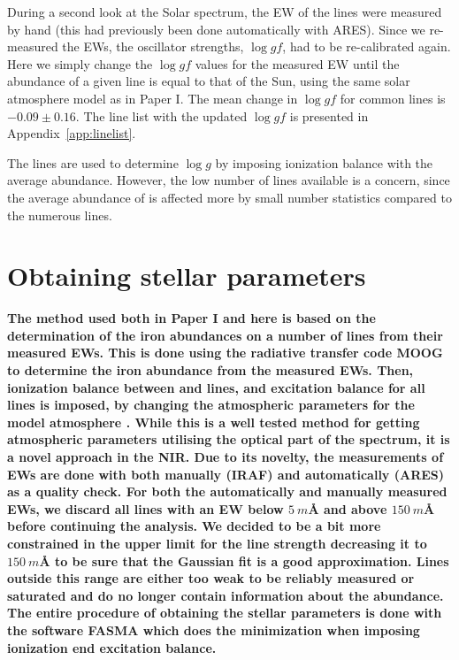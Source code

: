 \documentclass{aa}
\begin{document}
During a second look at the Solar spectrum, the EW of the lines were measured by
hand (this had previously been done automatically with ARES). Since we
re-measured the EWs, the oscillator strengths, $\log \mathit{gf}$, had to be
re-calibrated again. Here we simply change the $\log \mathit{gf}$ values for the
measured EW until the abundance of a given line is equal to that of the Sun,
using the same solar atmosphere model as in Paper I. The mean change in $\log
\mathit{gf}$ for common lines is $-0.09 \pm 0.16$. The line list with the
updated $\log \mathit{gf}$ is presented in Appendix~\ref{app:linelist}.

The  lines are used to determine $\log g$ by imposing ionization
balance with the average  abundance. However, the low number of
 lines available is a concern, since the average abundance of
 is affected more by small number statistics compared to the
numerous  lines.


\section{Obtaining stellar parameters}
\label{sec:method}

{\bf The method used both in Paper I and here is based on the determination of
the iron abundances on a number of lines from their measured EWs. This is done
using the radiative transfer code MOOG \citep{Sneden1973} to determine the iron
abundance from the measured EWs. Then, ionization balance between 
and  lines, and excitation balance for all  lines is
imposed, by changing the atmospheric parameters for the model atmosphere
\citep[][ATLAS9 is used here]{Kurucz1993}. While this is a well tested method
for getting atmospheric parameters utilising the optical part of the spectrum,
it is a novel approach in the NIR. Due to its novelty, the measurements of EWs
are done with both manually (IRAF) and automatically (ARES) as a quality check.
For both the automatically and manually measured EWs, we discard all lines with
an EW below $\SI{5}{m}$\AA{} and above $\SI{150}{m}$\AA{} before continuing the
analysis. We decided to be a bit more constrained in the upper limit for the
line strength decreasing it to $\SI{150}{m}$\AA{} to be sure that the Gaussian
fit is a good approximation. Lines outside this range are either too weak to be
reliably measured or saturated and do no longer contain information about the
abundance. The entire procedure of obtaining the stellar parameters is done with
the software FASMA \citep{Andreasen2017a} which does the minimization when
imposing ionization end excitation balance.}
\end{document}
